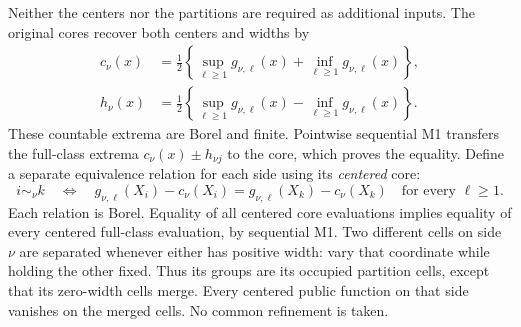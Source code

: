 Neither the centers nor the partitions are required as additional inputs.
The original cores recover both centers and widths by
\begin{equation}
 \begin{aligned}
 c_\nu(x)&=\tfrac12\left\{\sup_{\ell\ge1}g_{\nu,\ell}(x)
                         +\inf_{\ell\ge1}g_{\nu,\ell}(x)\right\},\\
 h_\nu(x)&=\tfrac12\left\{\sup_{\ell\ge1}g_{\nu,\ell}(x)
                         -\inf_{\ell\ge1}g_{\nu,\ell}(x)\right\}.
 \end{aligned}
 \label{eq:adaptation-midpoint}
\end{equation}
These countable extrema are Borel and finite. Pointwise sequential M1
transfers the full-class extrema $c_\nu(x)\pm h_{\nu j}$ to the core,
which proves the equality. Define a separate equivalence relation for
each side using its \emph{centered} core:
\begin{equation}
 i\sim_\nu k\quad\Longleftrightarrow\quad
 g_{\nu,\ell}(X_i)-c_\nu(X_i)
   =g_{\nu,\ell}(X_k)-c_\nu(X_k)
 \quad\text{for every }\ell\ge1.
 \label{eq:adaptation-equivalence}
\end{equation}
Each relation is Borel. Equality of all centered core evaluations
implies equality of every centered full-class evaluation, by sequential
M1. Two different cells on side $\nu$ are separated whenever either
has positive width: vary that coordinate while holding the other fixed.
Thus its groups are its occupied partition cells, except that its
zero-width cells merge. Every centered public function on that side
vanishes on the merged cells. No common refinement is taken.

